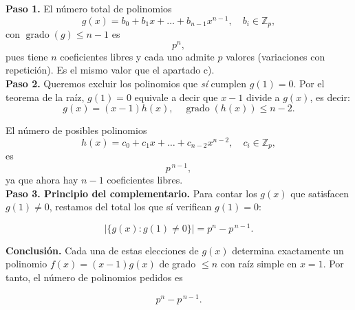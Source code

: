 \documentclass[a4paper,12pt]{article}
\begin{document}
\begin{ejercicio}[title=Ejercicio 3]
\begin{itemize}
\textbf{Paso 1.}  
El número total de polinomios
\[
g(x) = b_0 + b_1 x + \dots + b_{n-1} x^{n-1}, \quad b_i \in \mathbb{Z}_p,
\]
con $\operatorname{grado}(g)\le n-1$ es
\[
p^n,
\]
pues tiene $n$ coeficientes libres y cada uno admite $p$ valores (variaciones con repetición). Es el mismo valor que el apartado c).
\[
\]
\textbf{Paso 2.}  
Queremos excluir los polinomios que \emph{sí} cumplen \(g(1)=0\).  
Por el teorema de la raíz, \(g(1)=0\) equivale a decir que \(x-1\) divide a \(g(x)\), es decir:
\[
g(x) = (x-1)h(x),
\quad \operatorname{grado}(h(x))\le n-2.
\]

El número de posibles polinomios 
\[
h(x) = c_0 + c_1 x + \dots + c_{n-2} x^{n-2}, \quad c_i \in \mathbb{Z}_p,
\]
es
\[
p^{\,n-1},
\]
ya que ahora hay \(n-1\) coeficientes libres.
\[
\]
\textbf{Paso 3. Principio del complementario.}  
Para contar los \(g(x)\) que satisfacen \(g(1)\neq 0\), restamos del total los que sí verifican \(g(1)=0\):

\[
|\{g(x): g(1)\neq 0\}|
=
p^n - p^{\,n-1}.
\]

\medskip
\textbf{Conclusión.}  
Cada una de estas elecciones de \(g(x)\) determina exactamente un polinomio  
\(f(x)=(x-1)g(x)\) de grado \(\le n\) con raíz simple en \(x=1\). Por tanto, el número de polinomios pedidos es

\[
\boxed{p^n - p^{\,n-1}}.
\]

\end{itemize}

\end{ejercicio}
\end{document}
